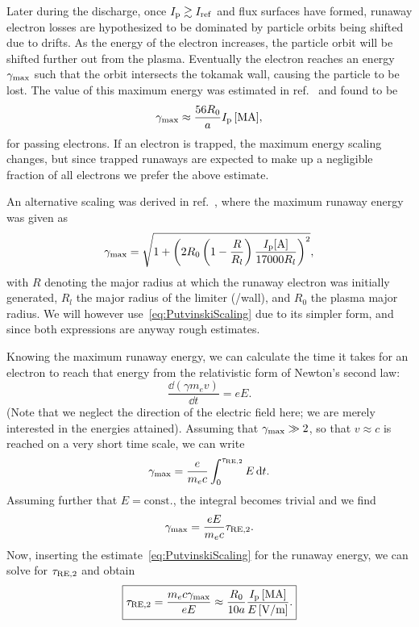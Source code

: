 \documentclass{notes}
\newcommand{\Ip}{I_{\rm p}}
\begin{document}
    Later during the discharge, once $\Ip\gtrsim I_{\rm ref}$ and flux surfaces
    have formed, runaway electron losses are hypothesized to be dominated by
    particle orbits being shifted due to drifts. As the energy of the electron
    increases, the particle orbit will be shifted further out from the plasma.
    Eventually the electron reaches an energy $\gamma_{\rm max}$ such that the
    orbit intersects the tokamak wall, causing the particle to be lost. The
    value of this maximum energy was estimated in ref.~\cite{Putvinski2010} and
    found to be
    \begin{equation}\label{eq:PutvinskiScaling}
        \gamma_{\rm max} \approx \frac{56R_0}{a}\Ip\,[\si{MA}],
    \end{equation}
    for passing electrons. If an electron is trapped, the maximum energy scaling
    changes, but since trapped runaways are expected to make up a negligible
    fraction of all electrons we prefer the above estimate.

    An alternative scaling was derived in ref.~\cite{MartinSolis1999}, where the
    maximum runaway energy was given as
    \begin{equation}
        \gamma_{\rm max} = \sqrt{
            1+
            \left( 2R_0\left( 1 -\frac{R}{R_l}\right)\frac{\Ip [\si{A}]}{17000 R_l}\right)^2
        },
    \end{equation}
    with $R$ denoting the major radius at which the runaway electron was
    initially generated, $R_l$ the major radius of the limiter (/wall), and
    $R_0$ the plasma major radius. We will however
    use~\eqref{eq:PutvinskiScaling} due to its simpler form, and since both
    expressions are anyway rough estimates.

    Knowing the maximum runaway energy, we can calculate the time it takes for
    an electron to reach that energy from the relativistic form of Newton's
    second law:
    \begin{equation}
        \frac{\dd\left(\gamma m_ev\right)}{\dd t} = eE.
    \end{equation}
    (Note that we neglect the direction of the electric field here; we are
    merely interested in the energies attained). Assuming that
    $\gamma_{\rm max}\gg 2$, so that $v\approx c$ is reached on a very short
    time scale, we can write
    \begin{equation}
        \gamma_{\rm max} = \frac{e}{m_ec}\int_0^{\tau_{\rm RE,2}} E\,\mathrm{d} t.
    \end{equation}
    Assuming further that $E=\mathrm{const.}$, the integral becomes trivial
    and we find
    \begin{equation}
        \gamma_{\rm max} = \frac{eE}{m_ec}\tau_{\rm RE,2}.
    \end{equation}
    Now, inserting the estimate~\eqref{eq:PutvinskiScaling} for the runaway
    energy, we can solve for $\tau_{\rm RE,2}$ and obtain
    \begin{equation}
        \boxed{
        \tau_{\rm RE,2} = \frac{m_e c\gamma_{\rm max}}{eE} \approx
        \frac{R_0}{10a}\frac{\Ip\,[\si{MA}]}{E\,[\si{V/m}]}.
        }
    \end{equation}
\end{document}
